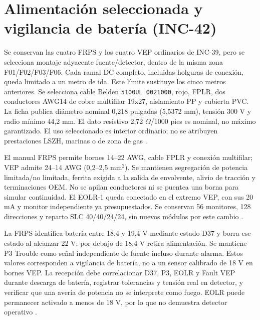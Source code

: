 \section{Alimentación seleccionada y vigilancia de batería (INC-42)}
\label{sec:sd4-inc42}
Se conservan las cuatro FRPS y los cuatro VEP ordinarios de INC-39, pero se selecciona montaje adyacente fuente/detector, dentro de la misma zona F01/F02/F03/F06. Cada ramal DC completo, incluidas holguras de conexión, queda limitado a un metro de ida. Este límite sustituye los cinco metros anteriores. Se selecciona cable Belden \texttt{5100UL 0021000}, rojo, FPLR, dos conductores AWG14 de cobre multifilar 19x27, aislamiento PP y cubierta PVC. La ficha publica diámetro nominal 0,218 pulgadas (5,5372 mm), tensión 300 V y radio mínimo 44,2 mm. El dato resistivo 2,72 $\Omega$/1000 pies es nominal, no máximo garantizado. El uso seleccionado es interior ordinario; no se atribuyen prestaciones LSZH, marinas o de zona de gas \parencite[pp.~1--2]{lote42-belden5100ul}.

El manual FRPS permite bornes 14--22 AWG, cable FPLR y conexión multifilar; VEP admite 24--14 AWG (0,2--2,5 mm$^2$). Se mantienen segregación de potencia limitada/no limitada, ferrita exigida a la salida de envolvente, alivio de tracción y terminaciones OEM. No se apilan conductores ni se puentea una borna para simular continuidad. El EOLR-1 queda conectado en el extremo VEP, con sus 20 mA y monitor independiente ya presupuestados. Se conservan 56 monitores, 128 direcciones y reparto SLC 40/40/24/24, sin nuevos módulos por este cambio \parencite[secs.~1.3, 2.1.2 y 2.5]{lote39-frpsmanual}\parencite[p.~2]{lote30-vep36106}.

La FRPS identifica batería entre 18,4 y 19,4 V mediante estado D37 y borra ese estado al alcanzar 22 V; por debajo de 18,4 V retira alimentación. Se mantiene P3 Trouble como señal independiente de fuente incluso durante alarma. Estos valores corresponden a vigilancia de batería, no a un sensor calibrado de 18 V en bornes VEP. La recepción debe correlacionar D37, P3, EOLR y Fault VEP durante descarga de batería, registrar tolerancias y tensión real en detector, y verificar que una avería de potencia no se interprete como fuego. EOLR puede permanecer activado a menos de 18 V, por lo que no demuestra detector operativo \parencite[secs.~1.3--1.4]{lote39-frpsmanual}\parencite{lote39-eolr1}.

